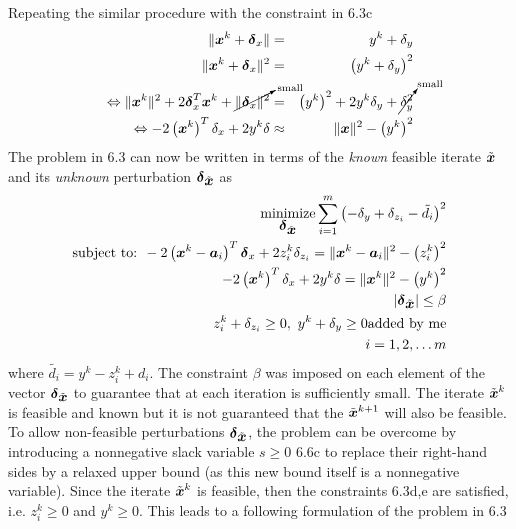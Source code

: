 Repeating the similar procedure with the constraint in 6.3c
\begin{eqnarray}
\nonumber
\|\mbox{\boldmath$x$}^k + \mbox{\boldmath${\delta}$}_x\| & = & y^k + \delta_y \\
\nonumber
\|\mbox{\boldmath$x$}^k + \mbox{\boldmath${\delta}$}_x\|^2 & = & \left(y^k + \delta_y \right)^2 \\
\nonumber
\Leftrightarrow \|\mbox{\boldmath$x$}^k\|^2 + 2\mbox{\boldmath${\delta}$}_x^T\mbox{\boldmath$x$}^k + \cancelto{\mbox{\scriptsize{small}}}{\|\mbox{\boldmath${\delta}$}_x\|^2} & = & \left(y^k\right)^2 + 2y^k\delta_y +  \cancelto{\mbox{\scriptsize{small}}}{\delta_y^2} \\
\nonumber
\Leftrightarrow -2\left(\mbox{\boldmath$x$}^k\right)^T\delta_x + 2y^k\delta & \approx & \|\mbox{\boldmath$x$}\|^2 - \left(y^k\right)^2
\end{eqnarray}
The problem in 6.3 can now be written in terms of the \textit{known} feasible  iterate $\tilde{\mbox{\boldmath$x$}}$ and its \textit{unknown} perturbation  $\mbox{\boldmath${\delta}$}_{\tilde{\mbox{\boldmath$x$}}}$ as
\begin{eqnarray} \label{eq:6.6}
\Min_{\Bdelta_{\tilde{\Bx}}} \sum^m_{i=1}\left( -\delta_y + \delta_{z_i} -\tilde{d_i}\right)^2\\
\nonumber
\mbox{subject to: } - 2\left( \Bx^k  - \Ba_i \right)^T\Bdelta_x + 2z_i^k\delta_{z_i}  = \|\Bx^k  - \Ba_i\|^2 - \left(z_i^k\right)^2 \\
\nonumber
-2\left(\Bx^k\right)^T\delta_x + 2y^k\delta = \|\Bx^k\|^2 - \left(y^k\right)^2 \\
\nonumber
|\Bdelta_{\tilde{\Bx}}|  \leq \beta \\
\nonumber
z_i^k + \delta_{z_i} \geq 0, \ 
y^k + \delta_y \geq 0 \mbox{added by me}
\\ \nonumber  i = 1, 2, \ldots m
\end{eqnarray}
where $\tilde{d_i} = y^k - z_i^k + d_i$. 
The constraint $\beta$ was imposed on each element of the vector $\mbox{\boldmath${\delta}$}_{\tilde{\mbox{\boldmath$x$}}}$ to guarantee that at each iteration is sufficiently small.
The iterate $\tilde{\mbox{\boldmath$x$}}^k$ is feasible and known but it is not guaranteed that the $\tilde{\mbox{\boldmath$x$}}^{k+1}$ will also be feasible. To allow non-feasible perturbations $\mbox{\boldmath${\delta}$}_{\tilde{\mbox{\boldmath$x$}}}$, the problem can be overcome by introducing a
nonnegative slack variable $s \geq 0$ 6.6c to replace their right-hand sides  by a  relaxed upper bound (as this new bound itself is a nonnegative variable). Since the iterate $\tilde{\mbox{\boldmath$x$}}^k$ is feasible, then the constraints 6.3d,e are satisfied, i.e. $z_i^k \geq 0$ and $y^k \geq 0$. This leads to a following formulation of the problem in 6.3
